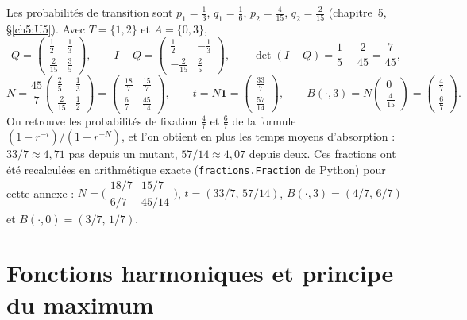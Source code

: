 \begin{example}[Moran, $N=3$, $r=2$ : le calcul complet]\label{appB:ex:moran3}
Les probabilités de transition sont $p_1=\frac13$, $q_1=\frac16$, $p_2=\frac4{15}$, $q_2=\frac2{15}$ (chapitre~5,
§\ref{ch5:U5}). Avec $T=\{1,2\}$ et $A=\{0,3\}$,
\[Q=\begin{pmatrix}\frac12&\frac13\\[2pt]\frac2{15}&\frac35\end{pmatrix},\qquad
I-Q=\begin{pmatrix}\frac12&-\frac13\\[2pt]-\frac2{15}&\frac25\end{pmatrix},\qquad\det(I-Q)=\frac15-\frac2{45}=\frac7{45},\]
\[N=\frac{45}7\begin{pmatrix}\frac25&\frac13\\[2pt]\frac2{15}&\frac12\end{pmatrix}=\begin{pmatrix}\frac{18}7&\frac{15}7\\[2pt]
\frac67&\frac{45}{14}\end{pmatrix},\qquad t=N\mathbf 1=\begin{pmatrix}\frac{33}7\\[2pt]\frac{57}{14}\end{pmatrix},\qquad
B(\cdot,3)=N\begin{pmatrix}0\\ \frac4{15}\end{pmatrix}=\begin{pmatrix}\frac47\\[2pt]\frac67\end{pmatrix}.\]
On retrouve les probabilités de fixation $\frac47$ et $\frac67$ de la formule $(1-r^{-i})/(1-r^{-N})$, et l'on obtient
en plus les temps moyens d'absorption : $33/7\approx4{,}71$ pas depuis un mutant, $57/14\approx4{,}07$ depuis deux. Ces
fractions ont été recalculées en arithmétique exacte (\texttt{fractions.Fraction} de Python) pour cette annexe
\tierX{} : $N=\bigl(\begin{smallmatrix}18/7&15/7\\6/7&45/14\end{smallmatrix}\bigr)$, $t=(33/7,\,57/14)$,
$B(\cdot,3)=(4/7,\,6/7)$ et $B(\cdot,0)=(3/7,\,1/7)$.
\end{example}

\section{Fonctions harmoniques et principe du maximum}\label{appB:sec:harm}

